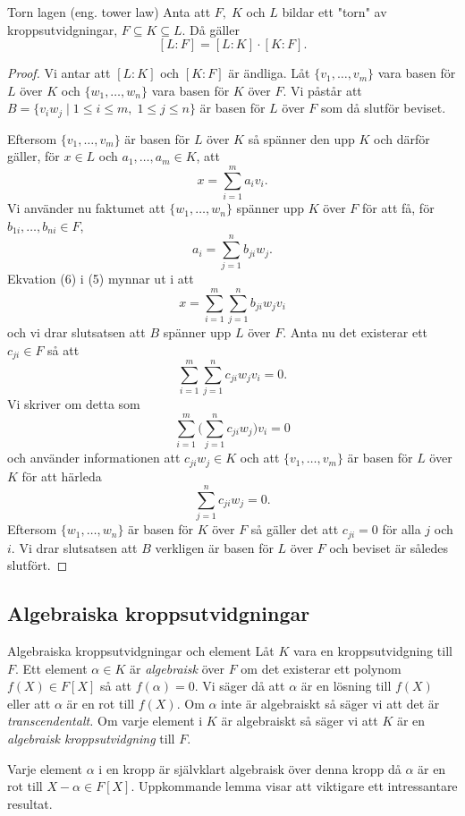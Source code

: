 \documentclass{article}
\theoremstyle{definition}
\begin{document}
\begin{mytheo}{Torn lagen (eng. tower law)}{}
  Anta att $F, \; K$ och $L$ bildar ett "torn" av kroppsutvidgningar, $F \subseteq K \subseteq L$. Då gäller
  \[ [L:F] = [L:K] \cdot [K:F]. \]
\end{mytheo}
\begin{proof}
  Vi antar att $[L:K]$ och $[K:F]$ är ändliga. Låt $\{v_1, \ldots, v_m\}$ vara basen för $L$ över $K$ och $\{w_1, \ldots, w_n\}$ vara basen för $K$ över $F$.
  Vi påstår att $B = \{v_iw_j \; | \; 1 \leq i \leq m, \; 1 \leq j \leq n\}$ är basen för $L$ över $F$ som då slutför beviset.

  Eftersom $\{v_1, \ldots, v_m\}$ är basen för $L$ över $K$ så spänner den upp $K$ och därför gäller, för $x \in L$ och $a_1, \ldots, a_m \in K$, att 
  \begin{equation}
    x = \sum_{i = 1}^m a_i v_i.
  \end{equation}
  Vi använder nu faktumet att $\{w_1, \ldots, w_n\}$ spänner upp $K$ över $F$ för att få, för 
  \linebreak
  $b_{1i}, \ldots, b_{ni} \in F$,
  \begin{equation}
    a_i = \sum_{j = 1}^n b_{ji}w_j.
  \end{equation}
  Ekvation (6) i (5) mynnar ut i att
  \[x = \sum_{i = 1}^m \sum_{j = 1}^n b_{ji}w_jv_i\]
  och vi drar slutsatsen att $B$ spänner upp $L$ över $F$. Anta nu det existerar ett $c_{ji} \in F$ så att 
  \[\sum_{i = 1}^m \sum_{j = 1}^n c_{ji}w_jv_i = 0.\]
  Vi skriver om detta som 
  \[\sum_{i = 1}^m \biggl( \sum_{j = 1}^n c_{ji}w_j \biggl) v_i = 0\]
  och använder informationen att $c_{ji}w_j \in K$ och att $\{v_1, \ldots, v_m\}$ är basen för $L$ över $K$ för att härleda
  \[\sum_{j = 1}^n c_{ji}w_j = 0.\]
  Eftersom $\{w_1, \ldots, w_n\}$ är basen för $K$ över $F$ så gäller det att $c_{ji} = 0$ för alla $j$ och $i$. Vi drar slutsatsen att 
  $B$ verkligen är basen för $L$ över $F$ och beviset är således slutfört. 
\end{proof}

\subsection{Algebraiska kroppsutvidgningar}
\begin{mydef}{Algebraiska kroppsutvidgningar och element}{}
  Låt $K$ vara en kroppsutvidgning till $F$. Ett element $\alpha \in K$ är \textit{algebraisk} över $F$ om det existerar ett polynom $f(X) \in F[X]$ 
  så att $f(\alpha) = 0.$ Vi säger då att $\alpha$ är en lösning till $f(X)$ eller att $\alpha$ är en rot till $f(X).$ Om $\alpha$ inte är algebraiskt så säger 
  vi att det är \textit{transcendentalt.}
  Om varje element i $K$ är algebraiskt så säger vi att $K$ är en \textit{algebraisk kroppsutvidgning} till $F$.
\end{mydef}
Varje element $\alpha$ i en kropp är självklart algebraisk över denna kropp då $\alpha$ är en rot till $X - \alpha \in F[X]$. Uppkommande lemma visar att 
viktigare ett intressantare resultat. 
\end{document}
